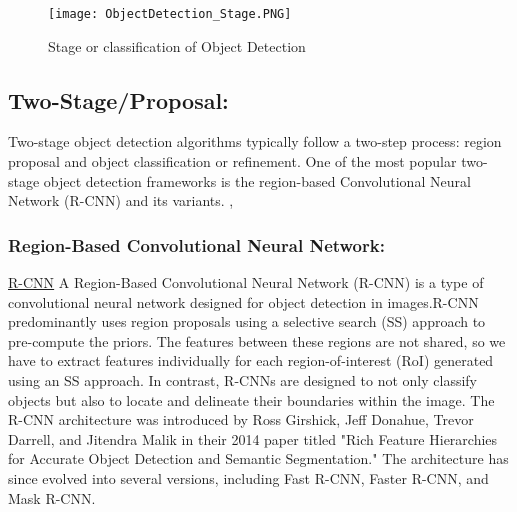 \begin{figure}[H]
    \centering
    \texttt{[image: ObjectDetection\_Stage.PNG]}
    \caption{Stage  or classification of Object Detection}
    \label{fig:Stage of Object Detection}
\end{figure}

\subsection{Two-Stage/Proposal: }
  Two-stage object detection algorithms typically follow a two-step process: region proposal and object classification or refinement. One of the most popular two-stage object detection frameworks is the region-based Convolutional Neural Network (R-CNN) and its variants. \cite{du2020overview}, \cite{ansari2020building}
\subsubsection{Region-Based Convolutional Neural Network: } \underline{\textcolor{blue}{\href{https://arxiv.org/pdf/1311.2524.pdf}{R-CNN}}}
 A Region-Based Convolutional Neural Network (R-CNN) is a type of convolutional neural network designed for object detection in images.R-CNN predominantly uses region proposals using a selective search (SS) approach to pre-compute the priors. The features between these regions are not shared, so we have to extract features individually for each region-of-interest (RoI) generated using an SS approach. In contrast, R-CNNs are designed to not only classify objects but also to locate and delineate their boundaries within the image.
The R-CNN architecture was introduced by Ross Girshick, Jeff Donahue, Trevor Darrell, and Jitendra Malik in their 2014 paper titled "Rich Feature Hierarchies for Accurate Object Detection and Semantic Segmentation." The architecture has since evolved into several versions, including Fast R-CNN, Faster R-CNN, and Mask R-CNN.
        
